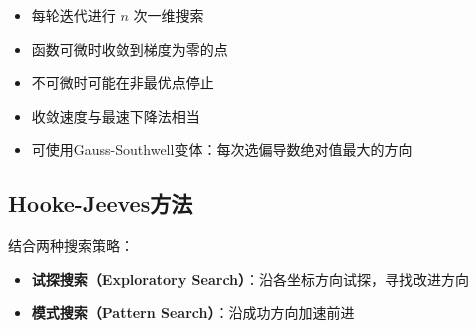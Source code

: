 \begin{notebox}[坐标轮换法的特点]
\begin{itemize}
    \item 每轮迭代进行 $n$ 次一维搜索
    \item 函数可微时收敛到梯度为零的点
    \item 不可微时可能在非最优点停止
    \item 收敛速度与最速下降法相当
    \item 可使用Gauss-Southwell变体：每次选偏导数绝对值最大的方向
\end{itemize}
\end{notebox}

\subsection{Hooke-Jeeves方法}\label{sec:hooke-jeeves}

\begin{conceptbox}[基本思想]
结合两种搜索策略：
\begin{itemize}
    \item \textbf{试探搜索（Exploratory Search）}：沿各坐标方向试探，寻找改进方向
    \item \textbf{模式搜索（Pattern Search）}：沿成功方向加速前进
\end{itemize}
\end{conceptbox}

